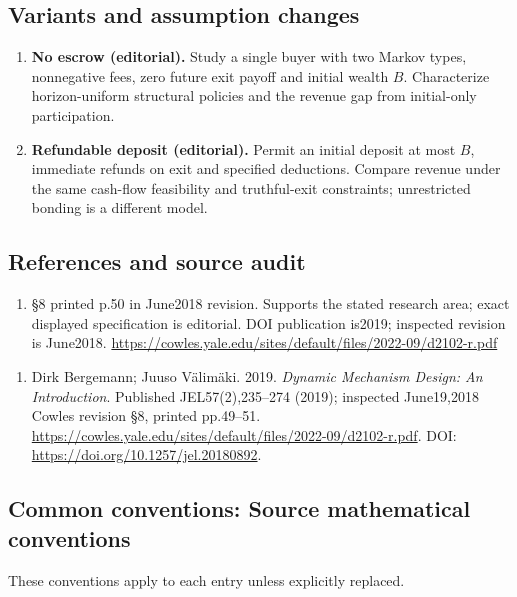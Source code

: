 \documentclass[11pt,a4paper]{article}
\begin{document}
\subsection*{Variants and assumption changes}
\begin{enumerate}
\item \textbf{No escrow (editorial).} Study a single buyer with two Markov types, nonnegative fees, zero future exit payoff and initial wealth \(B\). Characterize horizon-uniform structural policies and the revenue gap from initial-only participation.
\item \textbf{Refundable deposit (editorial).} Permit an initial deposit at most \(B\), immediate refunds on exit and specified deductions. Compare revenue under the same cash-flow feasibility and truthful-exit constraints; unrestricted bonding is a different model.
\end{enumerate}
\subsection*{References and source audit}
\begin{enumerate}
\item §8 printed p.50 in June2018 revision. Supports the stated research area; exact displayed specification is editorial. DOI publication is2019; inspected revision is June2018. \url{https://cowles.yale.edu/sites/default/files/2022-09/d2102-r.pdf}
\end{enumerate}
\begin{enumerate}\raggedright
\item\hypertarget{definitions:source:30007573:1}{} Dirk Bergemann; Juuso Välimäki. 2019. \emph{Dynamic Mechanism Design: An Introduction}. Published JEL57(2),235–274 (2019); inspected June19,2018 Cowles revision §8, printed pp.49–51.
\url{https://cowles.yale.edu/sites/default/files/2022-09/d2102-r.pdf}.
DOI: \url{https://doi.org/10.1257/jel.20180892}.
\end{enumerate}

\subsection*{Common conventions: Source mathematical conventions}

These conventions apply to each entry unless explicitly replaced.
\end{document}
